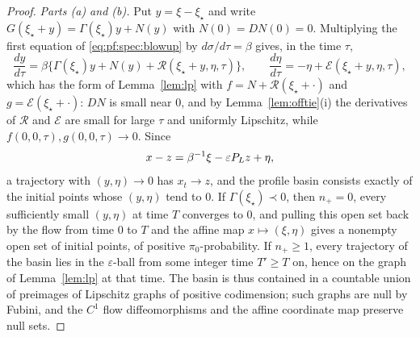 \documentclass{article} %
\makeatletter
\newif\ificlr
\newcommand{\placeblock}[1]{\ificlr\@nameuse{moved@#1}\fi}
\theoremstyle{plain}
\theoremstyle{definition}
\theoremstyle{remark}
\makeatother
\begin{document}
\ificlr\placeblock{spectralthm}\else\thmspectral*\fi
\placeblock{sketchspectral}
\placeblock{spectralafter}
\begin{proof}
\emph{Parts (a) and (b).} Put $y=\xi-\xi_\star$ and write $G(\xi_\star+y)=\Gamma(\xi_\star)y+N(y)$
with $N(0)=DN(0)=0$. Multiplying the first equation of \eqref{eq:pf:spec:blowup} by
$d\sigma/d\tau=\beta$ gives, in the time $\tau$,
\[
\frac{dy}{d\tau}=\beta\bigl\{\Gamma(\xi_\star)y+N(y)+\mathcal R(\xi_\star+y,\eta,\tau)\bigr\},\qquad
\frac{d\eta}{d\tau}=-\eta+\mathcal E(\xi_\star+y,\eta,\tau),
\]
which has the form of Lemma~\ref{lem:lp} with $f=N+\mathcal R(\xi_\star+\cdot)$ and
$g=\mathcal E(\xi_\star+\cdot)$: $DN$ is small near $0$, and by Lemma~\ref{lem:offtie}(i) the
derivatives of $\mathcal R$ and $\mathcal E$ are small for large $\tau$ and uniformly Lipschitz,
while $f(0,0,\tau),g(0,0,\tau)\to0$. Since
\[
x-z=\beta^{-1}\xi-\varepsilon P_Lz+\eta,
\]
a trajectory with $(y,\eta)\to0$ has $x_t\to z$, and the profile basin consists exactly of the
initial points whose $(y,\eta)$ tend to $0$. If $\Gamma(\xi_\star)\prec0$, then $n_+=0$, every
sufficiently small $(y,\eta)$ at time $T$ converges to $0$, and pulling this open set back by the
flow from time $0$ to $T$ and the affine map $x\mapsto(\xi,\eta)$ gives a nonempty open set of
initial points, of positive $\pi_0$-probability. If $n_+\ge1$, every trajectory of the basin lies
in the $\varepsilon$-ball from some integer time $T'\ge T$ on, hence on the graph of
Lemma~\ref{lem:lp} at that time. The basin is thus contained in a countable union of preimages of
Lipschitz graphs of positive codimension; such graphs are null by Fubini, and the $C^1$ flow diffeomorphisms and
the affine coordinate map preserve null sets.


\end{proof}
\end{document}
